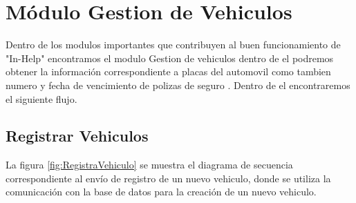 
\section{Módulo Gestion de Vehiculos}
Dentro de los modulos importantes que contribuyen al buen funcionamiento de "In-Help" encontramos el modulo Gestion de vehiculos dentro de el podremos obtener la información correspondiente a placas del automovil como tambien numero y fecha de vencimiento de polizas de seguro . Dentro de el encontraremos el siguiente flujo.\\



\subsection{Registrar Vehiculos}

La figura \ref{fig:RegistraVehiculo} se muestra el diagrama de secuencia correspondiente al envío de registro de un nuevo vehiculo, donde se utiliza la comunicación con la base de datos para la creación de un nuevo vehiculo.

